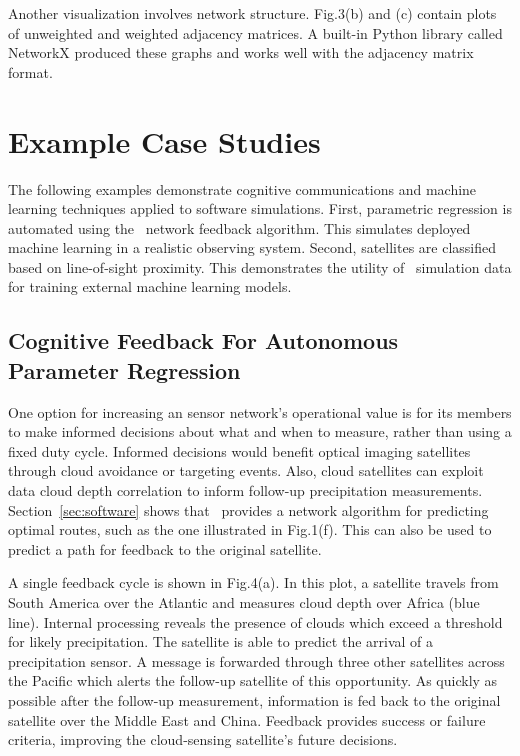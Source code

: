 \documentclass[conference]{IEEEtran}
\newcommand{\project}{{\sc{Collaborate}}~}
\begin{document}
Another visualization involves network structure.  Fig.3(b) and (c) contain plots of unweighted and weighted adjacency matrices.  A built-in Python library called NetworkX produced these graphs and works well with the adjacency matrix format.


\section{Example Case Studies}
\label{sec:examples}

The following examples demonstrate cognitive communications and machine learning techniques applied to software simulations.  First, parametric regression is automated using the \project network feedback algorithm.  This simulates deployed machine learning in a realistic observing system.  Second, satellites are classified based on line-of-sight proximity.  This demonstrates the utility of \project simulation data for training external machine learning models.

\subsection{Cognitive Feedback For Autonomous Parameter Regression}
\label{ssec:feedback}

One option for increasing an sensor network's operational value is for its members to make informed decisions about what and when to measure, rather than using a fixed duty cycle.  Informed decisions would benefit optical imaging satellites through cloud avoidance or targeting events.  Also, cloud satellites can exploit data cloud depth correlation to inform follow-up precipitation measurements.  Section~\ref{sec:software} shows that \project provides a network algorithm for predicting optimal routes, such as the one illustrated in Fig.1(f).  This can also be used to predict a path for feedback to the original satellite.

A single feedback cycle is shown in Fig.4(a).  In this plot, a satellite travels from South America over the Atlantic and measures cloud depth over Africa (blue line).  Internal processing reveals the presence of clouds which exceed a threshold for likely precipitation.  The satellite is able to predict the arrival of a precipitation sensor.  A message is forwarded through three other satellites across the Pacific which alerts the follow-up satellite of this opportunity.  As quickly as possible after the follow-up measurement, information is fed back to the original satellite over the Middle East and China.  Feedback provides success or failure criteria, improving the cloud-sensing satellite's future decisions.
\end{document}

